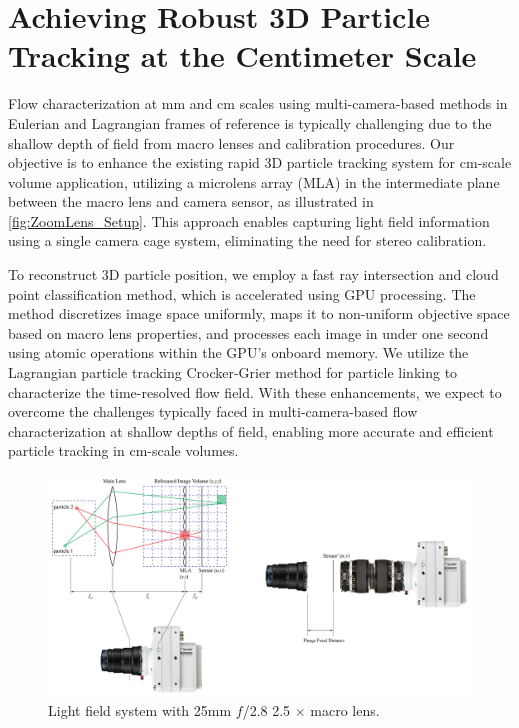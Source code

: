 \documentclass[draftthesis,fullpage]{uiucthesis}
\begin{document}
\chapter{Achieving Robust 3D Particle Tracking at the Centimeter Scale}\label{chapter:cm}
Flow characterization at mm and cm scales using multi-camera-based methods in Eulerian and Lagrangian frames of reference is typically challenging due to the shallow depth of field from macro lenses and calibration procedures. Our objective is to enhance the existing rapid 3D particle tracking system for cm-scale volume application, utilizing a microlens array (MLA) in the intermediate plane between the macro lens and camera sensor, as illustrated in \autoref{fig:ZoomLens_Setup}. This approach enables capturing light field information using a single camera cage system, eliminating the need for stereo calibration. 

To reconstruct 3D particle position, we employ a fast ray intersection and cloud point classification method, which is accelerated using GPU processing. The method discretizes image space uniformly, maps it to non-uniform objective space based on macro lens properties, and processes each image in under one second using atomic operations within the GPU's onboard memory.
We utilize the Lagrangian particle tracking Crocker-Grier method for particle linking to characterize the time-resolved flow field. With these enhancements, we expect to overcome the challenges typically faced in multi-camera-based flow characterization at shallow depths of field, enabling more accurate and efficient particle tracking in cm-scale volumes.
\begin{figure}[h]
  \centerline{\includegraphics[width = 0.7\linewidth]{fig/ZoomLens_Setup.png}} 
  \caption{Light field system with 25mm $f$/2.8 2.5 $\times$ macro lens. 
  }
\label{fig:ZoomLens_Setup}
\end{figure}
\end{document}
